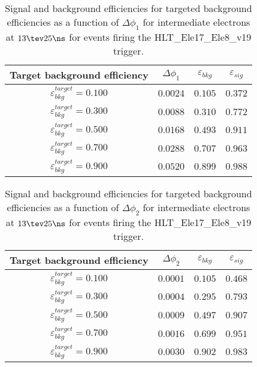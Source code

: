 \clearpage

\begin{table}[!bht]
  \begin{center}
    \begin{tabular}{cccc}
      \hline
      Target background efficiency & $\Delta\phi_1$ & $\varepsilon_{bkg}$ & $\varepsilon_{sig}$ \\ 
      \hline
      $\varepsilon_{bkg}^{target} = 0.100$ & $  0.0024$ & $0.105$ & $0.372$ \\
      $\varepsilon_{bkg}^{target} = 0.300$ & $  0.0088$ & $0.310$ & $0.772$ \\
      $\varepsilon_{bkg}^{target} = 0.500$ & $  0.0168$ & $0.493$ & $0.911$ \\
      $\varepsilon_{bkg}^{target} = 0.700$ & $  0.0288$ & $0.707$ & $0.963$ \\
      $\varepsilon_{bkg}^{target} = 0.900$ & $  0.0520$ & $0.899$ & $0.988$ \\
      \hline
    \end{tabular}
    \caption{Signal and background efficiencies for targeted background efficiencies as a function of $\Delta\phi_1$ for intermediate electrons at $13\tev 25\ns$ for events firing the HLT\_Ele17\_Ele8\_v19 trigger.}
    \label{tab:eff_rej_phi1_beam_13_25_trigger_17_8_I}
  \end{center}
\end{table}

\clearpage

\begin{table}[!bht]
  \begin{center}
    \begin{tabular}{cccc}
      \hline
      Target background efficiency & $\Delta\phi_2$ & $\varepsilon_{bkg}$ & $\varepsilon_{sig}$ \\ 
      \hline
      $\varepsilon_{bkg}^{target} = 0.100$ & $  0.0001$ & $0.105$ & $0.468$ \\
      $\varepsilon_{bkg}^{target} = 0.300$ & $  0.0004$ & $0.295$ & $0.793$ \\
      $\varepsilon_{bkg}^{target} = 0.500$ & $  0.0009$ & $0.497$ & $0.907$ \\
      $\varepsilon_{bkg}^{target} = 0.700$ & $  0.0016$ & $0.699$ & $0.951$ \\
      $\varepsilon_{bkg}^{target} = 0.900$ & $  0.0030$ & $0.902$ & $0.983$ \\
      \hline
    \end{tabular}
    \caption{Signal and background efficiencies for targeted background efficiencies as a function of $\Delta\phi_2$ for intermediate electrons at $13\tev 25\ns$ for events firing the HLT\_Ele17\_Ele8\_v19 trigger.}
    \label{tab:eff_rej_phi2_beam_13_25_trigger_17_8_I}
  \end{center}
\end{table}

